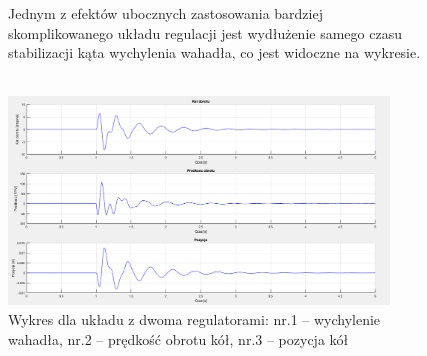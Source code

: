 \begin{figure}[h!]
    Jednym z efektów ubocznych zastosowania bardziej skomplikowanego układu regulacji jest wydłużenie samego czasu stabilizacji kąta wychylenia wahadła, co jest widoczne na wykresie.
    \\ \\ 
    \begin{center}
        \includegraphics[width=0.9\textwidth]{Rysunki/Rozdzial02/Podwojny_PID_wykresy.png}
	    \caption{Wykres dla układu z dwoma regulatorami: nr.1 -- wychylenie wahadła, nr.2 -- prędkość obrotu kół, nr.3 -- pozycja kół}
    \end{center}
	\label{Wykresy PID2}
\end{figure}